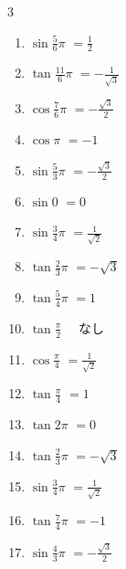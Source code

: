 \begin{multicols}{3}
\begin{enumerate}
  \item $\displaystyle \sin{\frac{5}{6}\pi}$
        $\displaystyle =\frac{1}{2}$

  \item $\displaystyle \tan{\frac{11}{6}\pi}$
        $\displaystyle =-\frac{1}{\sqrt{3}}$

  \item $\displaystyle \cos{\frac{7}{6}\pi}$
        $\displaystyle =-\frac{\sqrt{3}}{2}$

  \item $\displaystyle \cos{\pi}$
        $\displaystyle =-1$

  \item $\displaystyle \sin{\frac{5}{3}\pi}$
        $\displaystyle =-\frac{\sqrt{3}}{2}$

  \item $\displaystyle \sin{0}$
        $\displaystyle =0$

  \item $\displaystyle \sin{\frac{3}{4}\pi}$
        $\displaystyle =\frac{1}{\sqrt{2}}$

  \item $\displaystyle \tan{\frac{2}{3}\pi}$
        $\displaystyle =-\sqrt{3}$

  \item $\displaystyle \tan{\frac{5}{4}\pi}$
        $\displaystyle =1$

  \item $\displaystyle \tan{\frac{\pi}{2}}$
        $\displaystyle \quad なし$

  \item $\displaystyle \cos{\frac{\pi}{4}}$
        $\displaystyle =\frac{1}{\sqrt{2}}$

  \item $\displaystyle \tan{\frac{\pi}{4}}$
        $\displaystyle =1$

  \item $\displaystyle \tan{2\pi}$
        $\displaystyle =0$

  \item $\displaystyle \tan{\frac{2}{3}\pi}$
        $\displaystyle =-\sqrt{3}$

  \item $\displaystyle \sin{\frac{3}{4}\pi}$
        $\displaystyle =\frac{1}{\sqrt{2}}$

  \item $\displaystyle \tan{\frac{7}{4}\pi}$
        $\displaystyle =-1$

  \item $\displaystyle \sin{\frac{4}{3}\pi}$
        $\displaystyle =-\frac{\sqrt{3}}{2}$


\end{enumerate}
\end{multicols}
